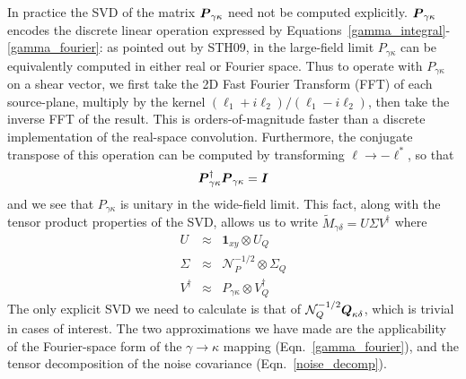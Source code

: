 In practice the SVD of the matrix $\boldsymbol{P}_{\gamma\kappa}$ 
need not be computed explicitly.  
$\boldsymbol{P}_{\gamma\kappa}$ encodes the discrete linear operation expressed
by Equations~\ref{gamma_integral}-\ref{gamma_fourier}: 
as pointed out by STH09, in the large-field limit $P_{\gamma\kappa}$ 
can be equivalently computed in either real or Fourier space.
Thus to operate with $P_{\gamma\kappa}$ on a shear vector, 
we first take the 2D Fast Fourier Transform (FFT) of each
source-plane, multiply by the kernel $(\ell_1+i\ell_2)/(\ell_1-i\ell_2)$,
then take the inverse FFT of the result.  This is orders-of-magnitude
faster than a discrete implementation of the real-space convolution.
Furthermore, the conjugate transpose of this operation can be computed
by transforming $\ell \to -\ell^*$, so that
\begin{equation}
  \boldsymbol{P}_{\gamma\kappa}^\dagger\boldsymbol{P}_{\gamma\kappa} = \boldsymbol{I}
\end{equation}
and we see that $P_{\gamma\kappa}$ is unitary in the wide-field limit.  This
fact, along with the tensor product properties of the SVD, allows us to
write $\widetilde{M}_{\gamma\delta} = U\Sigma V^\dagger$ where
\begin{eqnarray}
  U &\approx& \mathbf{1}_{xy} \otimes U_Q \nonumber\\
  \Sigma &\approx& \mathcal{N}_P^{-1/2} \otimes \Sigma_Q \nonumber\\
  V^\dagger &\approx& P_{\gamma\kappa} \otimes  V_Q^\dagger
\end{eqnarray}
The only explicit SVD we need to calculate is that of 
$\mathcal{N}_Q^{-1/2}\boldsymbol{Q}_{\kappa\delta}$,
which is trivial in cases of interest.  
The two approximations we have made are the
applicability of the Fourier-space form of the $\gamma\to\kappa$ mapping
(Eqn.~\ref{gamma_fourier}), and the tensor
decomposition of the noise covariance (Eqn.~\ref{noise_decomp}).
